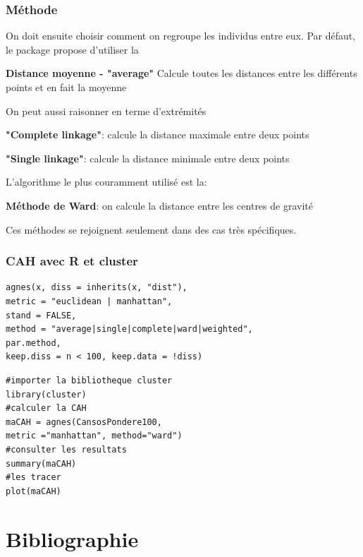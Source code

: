 \documentclass{beamer}
\begin{document}
\begin{frame}[fragile]
\frametitle{Méthode}

On doit ensuite choisir comment on regroupe les individus entre eux.
Par défaut, le package propose d'utiliser la

\textbf{Distance moyenne - "average"}  Calcule toutes les distances entre les différents points et en fait la moyenne

On peut aussi raisonner en terme d'extrémités 

\textbf{"Complete linkage"}: calcule la distance maximale entre deux points

\textbf{"Single linkage"}: calcule la distance minimale entre deux points

L'algorithme le plus couramment utilisé est la:

\textbf{Méthode de Ward}: on calcule la distance entre les centres de gravité 

Ces méthodes se rejoignent seulement dans des cas très spécifiques.

\end{frame}

\begin{frame}[fragile]
\frametitle{CAH avec R et cluster}

\begin{verbatim}
agnes(x, diss = inherits(x, "dist"), 
metric = "euclidean | manhattan",
stand = FALSE, 
method = "average|single|complete|ward|weighted",
par.method,
keep.diss = n < 100, keep.data = !diss)
\end{verbatim}

\begin{verbatim}
#importer la bibliotheque cluster
library(cluster)
#calculer la CAH
maCAH = agnes(CansosPondere100, 
metric ="manhattan", method="ward")
#consulter les resultats
summary(maCAH)
#les tracer
plot(maCAH)
\end{verbatim}

\end{frame}



\section{Bibliographie}
\end{document}
